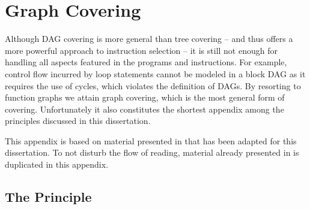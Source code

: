%

\chapter{Graph Covering}



Although \gls{DAG covering} is more general than \gls{tree covering} -- and thus
offers a more powerful approach to \gls{instruction selection} -- it is still
not enough for handling all aspects featured in the \glspl{program} and
\glspl{instruction}.
%
For example, control flow incurred by loop statements cannot be modeled in a
\gls{block DAG} as it requires the use of \glspl{cycle}, which violates the
definition of \glspl{DAG}.
%
By resorting to \glspl{function graph} we attain \gls{graph covering}, which is
the most general form of covering.
%
Unfortunately it also constitutes the shortest appendix among the
\glspl{principle} discussed in this dissertation.

This appendix is based on material presented in
\cite[Chap.]{HjortBlindell:2016:Survey} that has been adapted for
this dissertation.
%
To not disturb the flow of reading, material already presented in
 is duplicated in this appendix.


\section{The Principle}


